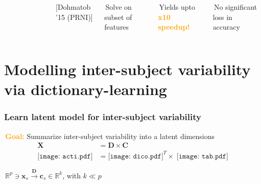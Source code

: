\documentclass{beamer}
\def\mydot{\structure{\rule{1ex}{1ex}}\,}
\def\B#1{\mathbf{#1}}
\def\emph#1{\textbf{\textcolor{orange}{#1}}}
\newcommand{\mycite}[1]{\textcolor{myblue}{[#1]}}
\begin{document}
\begin{frame}
\begin{columns}
\begin{overlayarea}{\textwidth}{\textheight}
{\begin{figure}
        \end{figure}
      }      
    \end{overlayarea}
    \mycite{Dohmatob '15 (PRNI)}
    \bigskip
    

        \mydot Solve on subset of features

        \bigskip 
    \mydot Yields upto \emph{x10 speedup!}

    \bigskip
    
    \mydot No significant loss in accuracy
  \end{columns}
 
\end{frame}






  



\section{Modelling inter-subject variability via dictionary-learning}
\begin{frame}
  \frametitle{Learn latent model for inter-subject variability}
  
    \mydot \emph{Goal:} Summarize inter-subject variability into a latent dimensions
    \begin{equation*}
      \begin{split}
      \B{X} &= \B{D} \times \B{C}\\
      {\texttt{[image: acti.pdf]}} &= {\texttt{[image: dico.pdf]}^T} \times \;{\texttt{[image: tab.pdf]}}
      \end{split}
    \end{equation*}

    \mydot $\mathbb R^p \ni \B{x}_s \overset{\B{D}}{\longrightarrow} \B{c}_s \in \mathbb R^k$, with $k \ll p$
\end{frame}  
\end{document}
